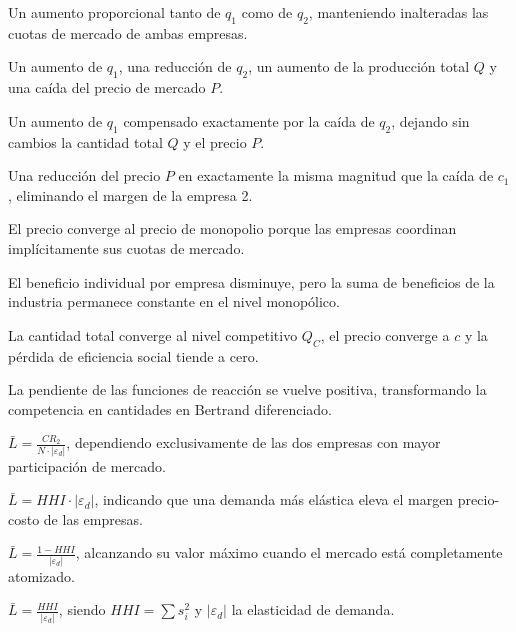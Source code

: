\begin{opts}
    \item Un aumento proporcional tanto de $q_1$ como de $q_2$, manteniendo inalteradas las cuotas de mercado de ambas empresas.
    \item Un aumento de $q_1$, una reducción de $q_2$, un aumento de la producción total $Q$ y una caída del precio de mercado $P$.
    \item Un aumento de $q_1$ compensado exactamente por la caída de $q_2$, dejando sin cambios la cantidad total $Q$ y el precio $P$.
    \item Una reducción del precio $P$ en exactamente la misma magnitud que la caída de $c_1$, eliminando el margen de la empresa 2.
\end{opts}

\begin{opts}
    \item El precio converge al precio de monopolio porque las empresas coordinan implícitamente sus cuotas de mercado.
    \item El beneficio individual por empresa disminuye, pero la suma de beneficios de la industria permanece constante en el nivel monopólico.
    \item La cantidad total converge al nivel competitivo $Q_C$, el precio converge a $c$ y la pérdida de eficiencia social tiende a cero.
    \item La pendiente de las funciones de reacción se vuelve positiva, transformando la competencia en cantidades en Bertrand diferenciado.
\end{opts}

\begin{opts}
    \item $\bar{L} = \frac{CR_2}{N \cdot |\varepsilon_d|}$, dependiendo exclusivamente de las dos empresas con mayor participación de mercado.
    \item $\bar{L} = HHI \cdot |\varepsilon_d|$, indicando que una demanda más elástica eleva el margen precio-costo de las empresas.
    \item $\bar{L} = \frac{1 - HHI}{|\varepsilon_d|}$, alcanzando su valor máximo cuando el mercado está completamente atomizado.
    \item $\bar{L} = \frac{HHI}{|\varepsilon_d|}$, siendo $HHI = \sum s_i^2$ y $|\varepsilon_d|$ la elasticidad de demanda.
\end{opts}

